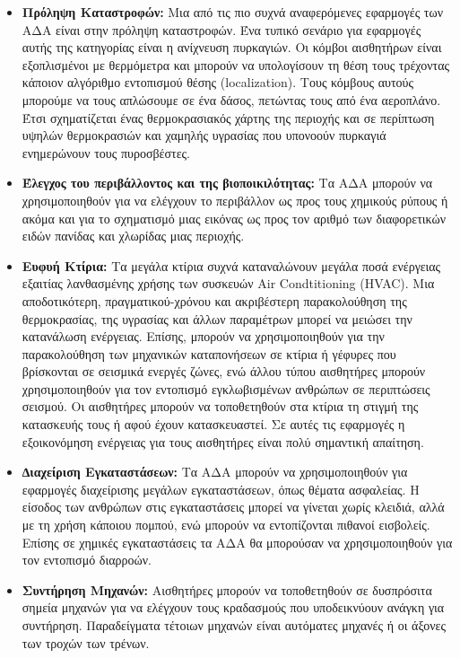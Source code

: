 \begin{itemize}
\item \textbf{Πρόληψη Καταστροφών:} Μια από τις πιο συχνά αναφερόμενες εφαρμογές των ΑΔΑ είναι στην πρόληψη καταστροφών.
Ένα τυπικό σενάριο για εφαρμογές αυτής της κατηγορίας είναι η ανίχνευση πυρκαγιών.
Οι κόμβοι αισθητήρων είναι εξοπλισμένοι με θερμόμετρα και μπορούν να υπολογίσουν τη θέση τους τρέχοντας κάποιον αλγόριθμο εντοπισμού θέσης (localization).
Τους κόμβους αυτούς μπορούμε να τους απλώσουμε σε ένα δάσος, πετώντας τους από ένα αεροπλάνο. Έτσι σχηματίζεται ένας θερμοκρασιακός χάρτης της
περιοχής και σε περίπτωση υψηλών θερμοκρασιών και χαμηλής υγρασίας που υπονοούν πυρκαγιά ενημερώνουν τους πυροσβέστες.
\item \textbf{Έλεγχος του περιβάλλοντος και της βιοποικιλότητας:} Τα ΑΔΑ μπορούν να χρησιμοποιηθούν για να ελέγχουν το περιβάλλον ως προς τους χημικούς ρύπους
ή ακόμα και για το σχηματισμό μιας εικόνας ως προς τον αριθμό των διαφορετικών ειδών πανίδας και χλωρίδας μιας περιοχής.
\item \textbf{Ευφυή Κτίρια:} Τα μεγάλα κτίρια συχνά καταναλώνουν μεγάλα ποσά ενέργειας εξαιτίας λανθασμένης χρήσης των συσκευών Air Condtitioning (HVAC).
Μια αποδοτικότερη, πραγματικού-χρόνου και ακριβέστερη παρακολούθηση της θερμοκρασίας, της υγρασίας και άλλων παραμέτρων μπορεί να μειώσει την κατανάλωση ενέργειας.
Επίσης, μπορούν να χρησιμοποιηθούν για την παρακολούθηση των μηχανικών καταπονήσεων σε κτίρια ή γέφυρες που βρίσκονται σε σεισμικά ενεργές ζώνες, ενώ άλλου τύπου
αισθητήρες μπορούν χρησιμοποιηθούν για τον εντοπισμό εγκλωβισμένων ανθρώπων σε περιπτώσεις σεισμού.
Οι αισθητήρες μπορούν να τοποθετηθούν στα κτίρια τη στιγμή της κατασκευής τους ή αφού έχουν κατασκευαστεί.
Σε αυτές τις εφαρμογές η εξοικονόμηση ενέργειας για τους αισθητήρες είναι πολύ σημαντική απαίτηση.
\item \textbf{∆ιαχείριση Εγκαταστάσεων:} Τα ΑΔΑ μπορούν να χρησιμοποιηθούν για εφαρμογές διαχείρισης μεγάλων εγκαταστάσεων, όπως θέματα ασφαλείας.
Η είσοδος των ανθρώπων στις εγκαταστάσεις μπορεί να γίνεται χωρίς κλειδιά, αλλά με τη χρήση κάποιου πομπού, ενώ μπορούν να εντοπίζονται πιθανοί εισβολείς.
Επίσης σε χημικές εγκαταστάσεις τα ΑΔΑ θα μπορούσαν να χρησιμοποιηθούν για τον εντοπισμό διαρροών.
\item \textbf{Συντήρηση Μηχανών:} Αισθητήρες μπορούν να τοποθετηθούν σε δυσπρόσιτα σημεία μηχανών για να ελέγχουν τους κραδασμούς που υποδεικνύουν ανάγκη για
συντήρηση.
Παραδείγματα τέτοιων μηχανών είναι αυτόματες μηχανές ή οι άξονες των τροχών των τρένων.

\end{itemize}
